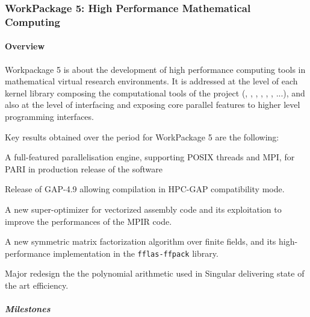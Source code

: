 \subsubsection{WorkPackage 5: High Performance Mathematical Computing}
  \label{hpc}


  \paragraph{Overview}

  Workpackage 5 is about the development of high performance computing tools in
  mathematical virtual research environments. It is addressed at the level
  of each kernel library composing the computational tools of the project (\Pari,
  \GAP, \Linbox, \MPIR, \Sage, \Singular, ...), and also at the level of interfacing and exposing
  core parallel features to higher level programming interfaces.

  Key results obtained over the period for WorkPackage 5 are the following:
  \begin{compactitem}
  \item A full-featured parallelisation engine, supporting POSIX threads and
  MPI, for PARI in production release of the software
  \item Release of GAP-4.9 allowing compilation  in HPC-GAP compatibility mode.
    \item A new super-optimizer for vectorized assembly code and its
    exploitation to improve the performances of the MPIR code.
  \item A new symmetric matrix factorization algorithm over finite fields, and
  its high-performance implementation in the \texttt{fflas-ffpack} library.
  \item Major redesign the the polynomial arithmetic used in Singular delivering
  state of the art efficiency.
\end{compactitem}

\subparagraph{Milestones}

